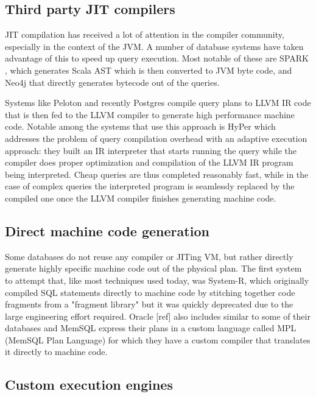 \subsection{Third party JIT compilers}

JIT compilation has received a lot of attention in the compiler
community, especially in the context of the JVM. A number of database
systems have taken advantage of this to speed up query execution. Most
notable of these are SPARK \cite{armbrustSparkSQLRelational2015}, which
generates Scala AST which is then converted to JVM byte code, and
Neo4j that directly generates bytecode out of the queries.

Systems like Peloton \cite{menonRelaxedOperatorFusion2017} and recently
Postgres \cite{sharyginQueryCompilationPostgreSQL2017} compile query
plans to LLVM IR code that is then fed to the LLVM compiler to
generate high performance machine code. Notable among the systems that
use this approach is HyPer \cite{neumannEvolutionCompilingQueryEngine}
which addresses the problem of query compilation overhead with an
adaptive execution approach: they built an IR interpreter that starts
running the query while the compiler does proper optimization and compilation of the
LLVM IR program being interpreted. Cheap queries are thus completed
reasonably fast, while in the case of complex queries the interpreted
program is seamlessly replaced by the compiled one once the LLVM
compiler finishes generating machine code.

\subsection{Direct machine code generation}

Some databases do not reuse any compiler or JITing VM, but rather
directly generate highly specific machine code out of the physical
plan. The first system to attempt that, like most techniques used
today, was System-R, which originally compiled SQL statements directly
to machine code by stitching together code fragments from a "fragment
library" \cite{chamberlinHistoryEvaluationSystem1981} but it was quickly
deprecated due to the large engineering effort required. Oracle [ref]
also includes similar to some of their databases and MemSQL express
their plans in a custom language called MPL (MemSQL Plan Language) for
which they have a custom compiler that translates it directly to
machine code.

\subsection{Custom execution engines}

